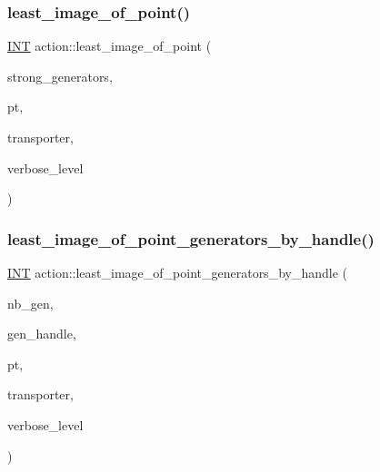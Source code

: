 \subsubsection{\texorpdfstring{least\+\_\+image\+\_\+of\+\_\+point()}{least\_image\_of\_point()}}
{\footnotesize\ttfamily \mbox{\hyperlink{galois_8h_a09fddde158a3a20bd2dcadb609de11dc}{I\+NT}} action\+::least\+\_\+image\+\_\+of\+\_\+point (\begin{DoxyParamCaption}\item[{\mbox{\hyperlink{classvector__ge}{vector\+\_\+ge}} \&}]{strong\+\_\+generators,  }\item[{\mbox{\hyperlink{galois_8h_a09fddde158a3a20bd2dcadb609de11dc}{I\+NT}}}]{pt,  }\item[{\mbox{\hyperlink{galois_8h_a09fddde158a3a20bd2dcadb609de11dc}{I\+NT}} $\ast$}]{transporter,  }\item[{\mbox{\hyperlink{galois_8h_a09fddde158a3a20bd2dcadb609de11dc}{I\+NT}}}]{verbose\+\_\+level }\end{DoxyParamCaption})}

\mbox{\label{classaction_a484afc1bf008118b3d0d8921b194d514}} 
\subsubsection{\texorpdfstring{least\+\_\+image\+\_\+of\+\_\+point\+\_\+generators\+\_\+by\+\_\+handle()}{least\_image\_of\_point\_generators\_by\_handle()}}
{\footnotesize\ttfamily \mbox{\hyperlink{galois_8h_a09fddde158a3a20bd2dcadb609de11dc}{I\+NT}} action\+::least\+\_\+image\+\_\+of\+\_\+point\+\_\+generators\+\_\+by\+\_\+handle (\begin{DoxyParamCaption}\item[{\mbox{\hyperlink{galois_8h_a09fddde158a3a20bd2dcadb609de11dc}{I\+NT}}}]{nb\+\_\+gen,  }\item[{\mbox{\hyperlink{galois_8h_a09fddde158a3a20bd2dcadb609de11dc}{I\+NT}} $\ast$}]{gen\+\_\+handle,  }\item[{\mbox{\hyperlink{galois_8h_a09fddde158a3a20bd2dcadb609de11dc}{I\+NT}}}]{pt,  }\item[{\mbox{\hyperlink{galois_8h_a09fddde158a3a20bd2dcadb609de11dc}{I\+NT}} $\ast$}]{transporter,  }\item[{\mbox{\hyperlink{galois_8h_a09fddde158a3a20bd2dcadb609de11dc}{I\+NT}}}]{verbose\+\_\+level }\end{DoxyParamCaption})}

